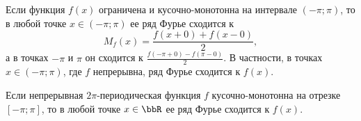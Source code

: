 \begin{cons}
Если функция $f(x)$ ограничена и кусочно-монотонна на интервале $(-\pi;\pi)$, то в любой точке $x \in (-\pi;\pi)$ ее ряд Фурье сходится к
$$
M_f(x) = \frac{f(x+0) + f(x-0)}{2},
$$
а в точках $-\pi$ и $\pi$ он сходится к $\frac{f(-\pi+0) - f(\pi-0)}{2}$. В частности, в точках $x \in (-\pi;\pi)$, где $f$ непрерывна, ряд Фурье сходится к $f(x)$.
\end{cons}
\begin{cons}
Если непрерывная $2\pi$-периодическая функция $f$ кусочно-монотонна на отрезке $[-\pi;\pi]$, то в любой точке $x \in \bbR$ ее ряд Фурье сходится к $f(x)$.
\end{cons}
